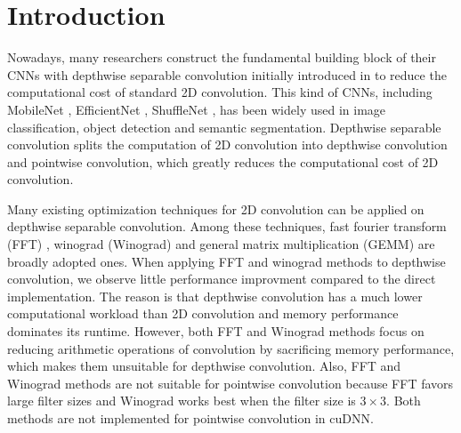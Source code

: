 \section{Introduction}
Nowadays, many researchers construct the fundamental building block of their CNNs with depthwise separable convolution initially introduced in \cite{sifre2014rigid} to reduce the computational cost of standard 2D convolution. 
This kind of CNNs, including MobileNet \cite{Sandler_2018_CVPR,howard2019searching}, EfficientNet \cite{tan2019efficientnet}, ShuffleNet \cite{Ma_2018_ECCV}, has been widely used in image classification, object detection and  semantic segmentation.
Depthwise separable convolution splits the computation of 2D convolution into depthwise convolution and pointwise convolution, which greatly reduces the computational cost of 2D convolution. 

Many existing optimization techniques for 2D convolution can be applied on depthwise separable convolution. 
Among these techniques, fast fourier transform (FFT) \cite{vasilache2014fast}, winograd (Winograd) \cite{lavin2016fast} and general matrix multiplication (GEMM) \cite{Vasudevan2017Parallel,Chellapilla2006High} are broadly adopted ones.
When applying FFT and winograd methods to depthwise convolution, we observe little performance improvment compared to the direct implementation. 
The reason is that depthwise convolution has a much lower computational workload than 2D convolution and memory performance dominates its runtime. 
However, both FFT and Winograd methods focus on reducing arithmetic operations of convolution by sacrificing memory performance, which makes them unsuitable for depthwise convolution.
Also, FFT and Winograd methods are not suitable for pointwise convolution because FFT favors large filter sizes and Winograd works best when the filter size is $3 \times 3$. Both methods are not implemented for pointwise convolution in cuDNN.

